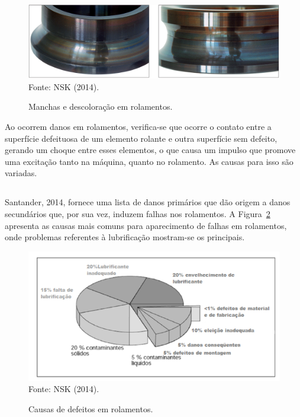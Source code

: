 \documentclass[
	12pt,				
	oneside,			
	a4paper,			
	english,			
	brazil,	
	sumario=abnt-6027-2012		
	]{abntex2ppgsi}
\begin{document}
\begin{figure}[H]
\centering
\caption {Manchas e descoloração em rolamentos.}
\includegraphics[width=\textwidth,height=\textheight,keepaspectratio]{manchas_nsk} \\
Fonte: NSK (2014).
\label{manchas_nsk}
\end{figure}

Ao ocorrem danos em rolamentos, verifica-se que ocorre o contato entre a superfície defeituosa de um elemento rolante e outra superfície sem defeito, gerando um choque entre esses elementos, o que causa um impulso que promove uma excitação tanto na máquina, quanto no rolamento. As causas para isso são variadas.

\subsection{}

Santander, 2014, fornece uma lista de danos primários que dão origem a danos secundários que, por sua vez, induzem falhas nos rolamentos. A Figura~\ref{falhas_comuns_rolamentos} apresenta as causas mais comuns para aparecimento de falhas em rolamentos, onde problemas referentes à lubrificação mostram-se os principais.

\begin{figure}[H]
\centering
\caption {Causas de defeitos em rolamentos.}
\includegraphics[width=\textwidth,height=\textheight,keepaspectratio]{falhas_comuns_rolamentos} \\
Fonte: NSK (2014).
\label{falhas_comuns_rolamentos}
\end{figure}
\end{document}
